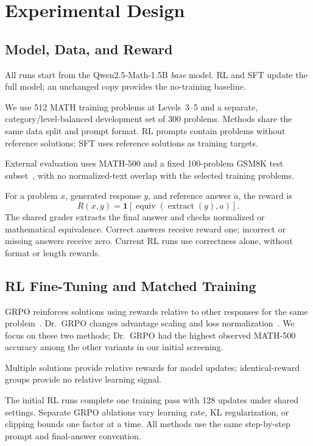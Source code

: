 \documentclass[conference]{IEEEtran}
\begin{document}
\section{Experimental Design}
\subsection{Model, Data, and Reward}
All runs start from the Qwen2.5-Math-1.5B \emph{base} model. RL and SFT update the full model; an unchanged copy provides the no-training baseline.

We use 512 MATH training problems at Levels~3--5 and a separate, category/level-balanced development set of 300 problems. Methods share the same data split and prompt format. RL prompts contain problems without reference solutions; SFT uses reference solutions as training targets.

External evaluation uses MATH-500 and a fixed 100-problem GSM8K test subset~\cite{gsm8k}, with no normalized-text overlap with the selected training problems.

For a problem $x$, generated response $y$, and reference answer $a$, the reward is
\begin{equation}
R(x,y)=\mathbf{1}\!\left[\operatorname{equiv}(\operatorname{extract}(y),a)\right].
\end{equation}
The shared grader extracts the final answer and checks normalized or mathematical equivalence. Correct answers receive reward one; incorrect or missing answers receive zero. Current RL runs use correctness alone, without format or length rewards.

\subsection{RL Fine-Tuning and Matched Training}
GRPO reinforces solutions using rewards relative to other responses for the same problem~\cite{grpo}. Dr.~GRPO changes advantage scaling and loss normalization~\cite{drgrpo}. We focus on these two methods; Dr.~GRPO had the highest observed MATH-500 accuracy among the other variants in our initial screening.

Multiple solutions provide relative rewards for model updates; identical-reward groups provide no relative learning signal.

The initial RL runs complete one training pass with 128 updates under shared settings. Separate GRPO ablations vary learning rate, KL regularization, or clipping bounds one factor at a time. All methods use the same step-by-step prompt and final-answer convention.
\end{document}
